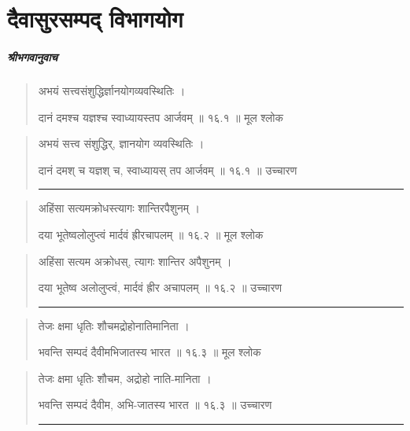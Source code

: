 \chapter{\sanskrit दैवासुरसम्पद् विभागयोग} 
\paragraph{\sanskrit श्रीभगवानुवाच}
\begin{quotation} 
अभयं सत्त्वसंशुद्धिर्ज्ञानयोगव्यवस्थितिः ।  

दानं दमश्च यज्ञश्च स्वाध्यायस्तप आर्जवम्‌  ॥ १६.१ ॥  मूल श्लोक
\end{quotation}

\begin{quotation}

अभयं सत्त्व संशुद्धिर्, ज्ञानयोग व्यवस्थितिः ।  

दानं दमश् च यज्ञश् च, स्वाध्यायस् तप आर्जवम्‌  ॥ १६.१ ॥  उच्चारण

\noindent\rule{16cm}{0.4pt} 
\end{quotation}


\begin{quotation}

अहिंसा सत्यमक्रोधस्त्यागः शान्तिरपैशुनम्‌ ।  

दया भूतेष्वलोलुप्त्वं मार्दवं ह्रीरचापलम्‌  ॥ १६.२ ॥  मूल श्लोक
\end{quotation}

\begin{quotation}

अहिंसा सत्यम अक्रोधस्, त्यागः शान्तिर अपैशुनम्‌ ।  

दया भूतेष्व अलोलुप्त्वं,  मार्दवं ह्रीर अचापलम्‌  ॥ १६.२ ॥  उच्चारण

\noindent\rule{16cm}{0.4pt} 
\end{quotation}


\begin{quotation}

तेजः क्षमा धृतिः शौचमद्रोहोनातिमानिता ।  

भवन्ति सम्पदं दैवीमभिजातस्य भारत  ॥ १६.३ ॥  मूल श्लोक
\end{quotation}

\begin{quotation}

तेजः क्षमा धृतिः शौचम, अद्रोहो नाति-मानिता ।  

भवन्ति सम्पदं दैवीम, अभि-जातस्य भारत  ॥ १६.३ ॥  उच्चारण

\noindent\rule{16cm}{0.4pt} 
\end{quotation}


